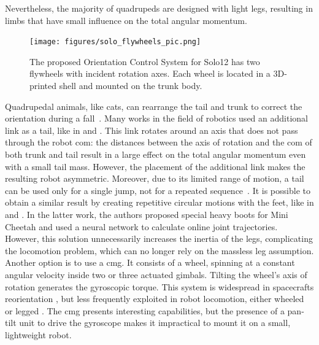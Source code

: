 \documentclass[letterpaper, 10 pt, conference]{ieeeconf}  %
\begin{document}
Nevertheless, the majority of quadrupeds are designed with light legs, resulting in limbs that have small influence on the total angular momentum.

\begin{figure}[t!]
	\centering
	\texttt{[image: figures/solo\_flywheels\_pic.png]}
	\caption{\small The proposed Orientation Control System for Solo12 has two flywheels with incident rotation axes. Each wheel is located in a 3D-printed shell and mounted on the trunk body.}
	\label{fig:solo12flywheels}
\end{figure} 

Quadrupedal animals, like cats, can rearrange the tail and trunk to correct the orientation during a fall~\cite{kane1969dynamical}.
Many works in the field of robotics used an additional link as a tail, like in \cite{chu2019null} and \cite{wenger2016frontal}.
This link rotates around an axis that does not pass through the robot \gls{com}: the distances between the axis of rotation and the \gls{com} of both trunk and tail result in a large effect on the total angular momentum even with a small tail mass.
However, the placement of the additional link makes the resulting robot asymmetric. Moreover, due to its limited range of motion, a tail can be used only for a single jump, not for a repeated sequence~\cite{johnson2012tail}.
It is possible to obtain a similar result by creating repetitive circular motions with the feet, like in \cite{hoffman2021exploiting} and \cite{kurtz2021mini}. In the latter work, the authors proposed special heavy boots for Mini Cheetah and used a neural network to calculate online joint trajectories. However, this solution unnecessarily increases the inertia of the legs, complicating the locomotion problem, which can no longer rely on the massless leg assumption. %
Another option is to use a \gls{cmg}.
It consists of a wheel, spinning at a constant angular velocity inside two or three actuated gimbals.
Tilting the wheel's axis of rotation generates the gyroscopic torque.
This system is widespread in spacecrafts reorientation \cite{yoon2002spacecraft}, but less frequently exploited in robot locomotion, either wheeled \cite{brown1996single} or legged \cite{mikhalkov2021gyrubot}.
The \gls{cmg} presents interesting capabilities, but the presence of a pan-tilt unit to drive the gyroscope makes it impractical to mount it on a small, lightweight robot.
\end{document}
